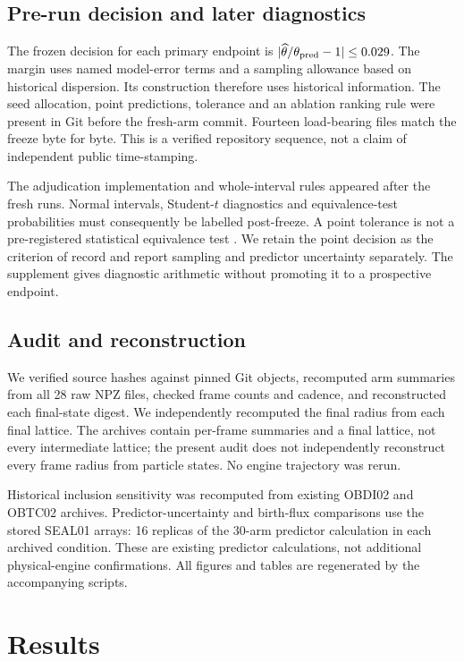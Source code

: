 \documentclass[11pt]{article}
\begin{document}
\subsection{Pre-run decision and later diagnostics}
The frozen decision for each primary endpoint is
$|\widehat\theta/\theta_{\rm pred}-1|\le0.029$.
The margin uses named model-error terms and a sampling allowance based on historical
dispersion. Its construction therefore uses historical information.
The seed allocation, point predictions, tolerance and an ablation ranking rule were present
in Git before the fresh-arm commit. Fourteen load-bearing files match the freeze byte for byte.
This is a verified repository sequence, not a claim of independent public time-stamping.

The adjudication implementation and whole-interval rules appeared after the fresh runs.
Normal intervals, Student-$t$ diagnostics and equivalence-test probabilities must consequently
be labelled post-freeze. A point tolerance is not a pre-registered statistical equivalence
test \citep{wellek2010}. We retain the point decision as the criterion of record and report
sampling and predictor uncertainty separately. The supplement gives diagnostic arithmetic
without promoting it to a prospective endpoint.

\subsection{Audit and reconstruction}
We verified source hashes against pinned Git objects, recomputed arm summaries from all
28 raw NPZ files, checked frame counts and cadence, and reconstructed each final-state digest.
We independently recomputed the final radius from each final lattice.
The archives contain per-frame summaries and a final lattice, not every intermediate lattice;
the present audit does not independently reconstruct every frame radius from particle states.
No engine trajectory was rerun.

Historical inclusion sensitivity was recomputed from existing OBDI02 and OBTC02 archives.
Predictor-uncertainty and birth-flux comparisons use the stored SEAL01 arrays:
16 replicas of the 30-arm predictor calculation in each archived condition.
These are existing predictor calculations, not additional physical-engine confirmations.
All figures and tables are regenerated by the accompanying scripts.

\section{Results}
\end{document}
